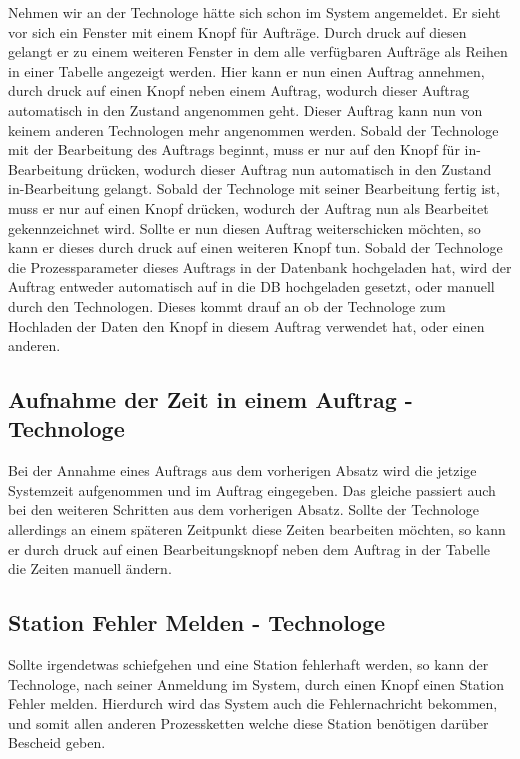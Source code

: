 \documentclass[enabledeprecatedfontcommands,fontsize=12pt,paper=a4,twoside]{scrartcl}
\begin{document}
Nehmen wir an der Technologe hätte sich schon im System angemeldet. Er sieht vor sich ein Fenster mit einem Knopf für Aufträge. Durch druck auf diesen gelangt er zu einem weiteren Fenster in dem alle verfügbaren Aufträge als Reihen in einer Tabelle angezeigt werden. Hier kann er nun einen Auftrag annehmen, durch druck auf einen Knopf neben einem Auftrag, wodurch dieser Auftrag automatisch in den Zustand angenommen geht. Dieser Auftrag kann nun von keinem anderen Technologen mehr angenommen werden. Sobald der Technologe mit der Bearbeitung des Auftrags beginnt, muss er nur auf den Knopf für in-Bearbeitung drücken, wodurch dieser Auftrag nun automatisch in den Zustand in-Bearbeitung gelangt. Sobald der Technologe mit seiner Bearbeitung fertig ist, muss er nur auf einen Knopf drücken, wodurch der Auftrag nun als Bearbeitet gekennzeichnet wird. Sollte er nun diesen Auftrag weiterschicken möchten, so kann er dieses durch druck auf einen weiteren Knopf tun. Sobald der Technologe die Prozessparameter dieses Auftrags in der Datenbank hochgeladen hat, wird der Auftrag entweder automatisch auf in die DB hochgeladen gesetzt, oder manuell durch den Technologen. Dieses kommt drauf an ob der Technologe zum Hochladen der Daten den Knopf in diesem Auftrag verwendet hat, oder einen anderen.

\subsection{Aufnahme der Zeit in einem Auftrag - Technologe}

Bei der Annahme eines Auftrags aus dem  vorherigen Absatz wird die jetzige Systemzeit aufgenommen und im Auftrag eingegeben. Das gleiche passiert auch bei den weiteren Schritten aus dem vorherigen Absatz.
Sollte der Technologe allerdings an einem späteren Zeitpunkt diese Zeiten bearbeiten möchten, so kann er durch druck auf einen Bearbeitungsknopf neben dem Auftrag in der Tabelle die Zeiten manuell ändern.  

\subsection{Station Fehler Melden - Technologe}

Sollte irgendetwas schiefgehen und eine Station fehlerhaft werden, so kann der Technologe, nach seiner Anmeldung im System, durch einen Knopf einen Station Fehler melden. Hierdurch wird das System auch die Fehlernachricht bekommen, und somit allen anderen Prozessketten welche diese Station benötigen darüber Bescheid geben. 
\end{document}
